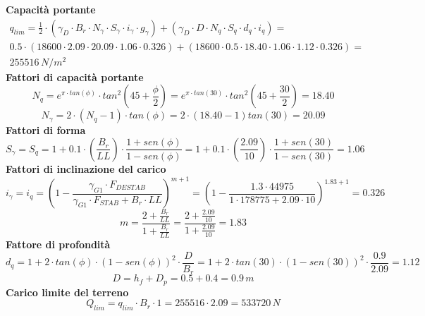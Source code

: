 \textbf{Capacità portante}
\begin{equation*}
\begin{split}
    q_{lim} = \frac{1}{2} \cdot (\gamma_D \cdot B_r \cdot N_{\gamma} \cdot S_{\gamma} \cdot i_{\gamma} \cdot g_{\gamma}) + (\gamma_D \cdot D \cdot N_q \cdot S_q \cdot d_q \cdot i_q) =\\
    0.5 \cdot (18600 \cdot 2.09 \cdot 20.09 \cdot 1.06 \cdot 0.326) + (18600 \cdot 0.5 \cdot 18.40 \cdot 1.06 \cdot 1.12 \cdot 0.326) =\\
     255516 \,N/m^2
\end{split}
\end{equation*}
\textbf{Fattori di capacità portante}
\begin{equation*}
    N_q = e^{\pi \cdot tan(\phi)} \cdot tan^2 \left(45 + \frac{\phi}{2}\right) = e^{\pi \cdot tan(30)} \cdot tan^2 \left(45 + \frac{30}{2}\right) = 18.40 
\end{equation*}
\begin{equation*}
    N_{\gamma} = 2 \cdot (N_q -1) \cdot tan(\phi) = 2 \cdot (18.40 -1) tan (30) = 20.09
\end{equation*}
\textbf{Fattori di forma}
\begin{equation*}
    S_{\gamma} = S_q = 1+0.1 \cdot \left(\frac{B_r}{LL}\right) \cdot \frac{1+sen(\phi)}{1-sen(\phi)} = 1 + 0.1 \cdot \left(\frac{2.09}{10}\right) \cdot \frac{1+sen(30)}{1-sen(30)} = 1.06
\end{equation*}
\textbf{Fattori di inclinazione del carico}
\begin{equation*}
    i_{\gamma} = i_q = \left(1- \frac{\gamma_{G1} \cdot F_{DESTAB}}{\gamma_{G1} \cdot F_{STAB} + B_r \cdot LL}\right) ^{m+1} = \left(1- \frac{1.3 \cdot 44975}{1 \cdot 178775 + 2.09 \cdot 10}\right) ^{1.83+1} = 0.326
\end{equation*}
\begin{equation*}
    m= \frac{2+ \frac{B_r}{LL}}{1+ \frac{B_r}{LL}} = \frac{2+ \frac{2.09}{10}}{1+ \frac{2.09}{10}} = 1.83
\end{equation*}
\textbf{Fattore di profondità}
\begin{equation*}
    d_q = 1+ 2 \cdot tan(\phi) \cdot (1- sen(\phi))^2 \cdot \frac{D}{B_r} = 1+ 2 \cdot tan(30) \cdot (1- sen(30))^2 \cdot \frac{0.9}{2.09} = 1.12
\end{equation*}
\begin{equation*}
    D = h_f + D_p = 0.5 + 0.4 = 0.9 \,m
\end{equation*}
\textbf{Carico limite del terreno}
\begin{equation*}
    Q_{lim} = q_{lim} \cdot B_r \cdot 1 = 255516 \cdot 2.09 = 533720 \,N
\end{equation*}

